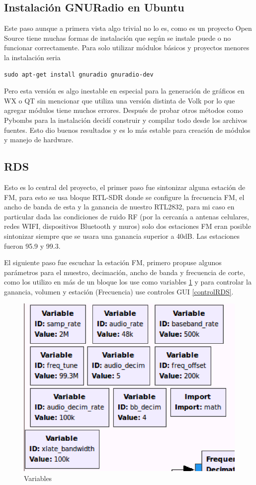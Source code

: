 \documentclass[preprint,12pt]{elsarticle}
\begin{document}
\subsection{Instalación GNURadio en Ubuntu}
Este paso aunque a primera vista algo trivial no lo es, como es un proyecto Open Source tiene muchas formas de instalación que según se instale puede o no funcionar correctamente.
Para solo utilizar módulos básicos y proyectos menores la instalación seria


\begin{lstlisting}
sudo apt-get install gnuradio gnuradio-dev
  \end{lstlisting}
 Pero esta versión es algo inestable en especial para la generación de gráficos en WX o QT sin mencionar que utiliza una versión distinta de Volk por lo que agregar módulos tiene muchos errores.
  Después de probar otros métodos como Pybombs para la instalación decidí construir y compilar todo desde los archivos fuentes. Esto dio buenos resultados y es lo más estable para creación de módulos y manejo de hardware.

  
 
  
\subsection{RDS}
Esto es lo central del proyecto, el primer paso fue sintonizar alguna estación de FM, para esto se usa bloque RTL-SDR donde se configure la frecuencia FM, el ancho de banda de esta y la ganancia de nuestro RTL2832, para mi caso en particular dada las condiciones de ruido RF (por la cercanía a antenas celulares, redes WIFI, dispositivos Bluetooth y muros) solo dos estaciones FM eran posible sintonizar siempre que se usara una ganancia superior a 40dB. Las estaciones fueron 95.9 y 99.3.


El siguiente paso fue escuchar la estación FM, primero propuse algunos parámetros para el muestro, decimación, ancho de banda y  frecuencia de corte, como los utilizo en más de un bloque los use como variables \ref{variablesRDS} y para controlar la ganancia, volumen y estación (Frecuencia) use controles GUI \ref{controlRDS}.


 \begin{figure}[htbp!]
\centering\includegraphics[width=0.35\linewidth]{variables.PNG}
\caption{Variables}
\label{variablesRDS}
\end{figure}
\end{document}
